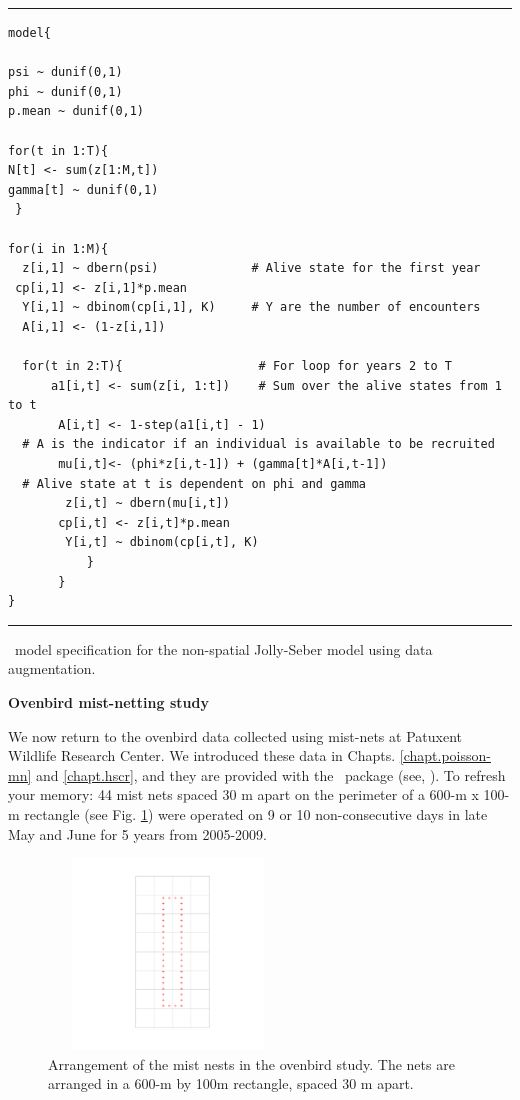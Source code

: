 \begin{panel}[htp]
\centering
\rule[0.1in]{\textwidth}{.03in}
{\small
\begin{verbatim}
model{

psi ~ dunif(0,1)
phi ~ dunif(0,1)
p.mean ~ dunif(0,1)

for(t in 1:T){
N[t] <- sum(z[1:M,t])
gamma[t] ~ dunif(0,1)
 }

for(i in 1:M){
  z[i,1] ~ dbern(psi)	          # Alive state for the first year
 cp[i,1] <- z[i,1]*p.mean
  Y[i,1] ~ dbinom(cp[i,1], K)     # Y are the number of encounters
  A[i,1] <- (1-z[i,1])

  for(t in 2:T){                   # For loop for years 2 to T
      a1[i,t] <- sum(z[i, 1:t])    # Sum over the alive states from 1 to t
       A[i,t] <- 1-step(a1[i,t] - 1)  
  # A is the indicator if an individual is available to be recruited
       mu[i,t]<- (phi*z[i,t-1]) + (gamma[t]*A[i,t-1])
  # Alive state at t is dependent on phi and gamma
        z[i,t] ~ dbern(mu[i,t])   
       cp[i,t] <- z[i,t]*p.mean
        Y[i,t] ~ dbinom(cp[i,t], K)
           }  
       } 
} 
\end{verbatim}
}

\rule[-0.1in]{\textwidth}{.03in}
\caption{
\jags~model specification for the non-spatial Jolly-Seber model using
data augmentation. }
\label{open.panel.nsJS}
\end{panel}


{\flushleft \bf Ovenbird mist-netting study}

We now return to the ovenbird data collected using mist-nets at
Patuxent Wildlife Research Center. We introduced these data in
Chapts. \ref{chapt.poisson-mn} and \ref{chapt.hscr}, and they are
provided with the \secr~package (see, \citet{efford_etal:2004,
  borchers_efford:2008}). To refresh your memory: 44 mist nets spaced
30 m apart on the perimeter of a 600-m x 100-m rectangle (see
Fig. \ref{open.figs.ovenbirdlocs}) were operated on 9 or 10
non-consecutive days in late May and June for 5 years from 2005-2009.

\begin{figure}
\centering
\includegraphics[height=2in,width=2.5in]{Ch16-Open/figs/ovenbirds.pdf}
\caption{Arrangement of the mist nests in the ovenbird study.  The nets are arranged in a 600-m by 100m
rectangle, spaced 30 m apart. }
\label{open.figs.ovenbirdlocs}
\end{figure}


